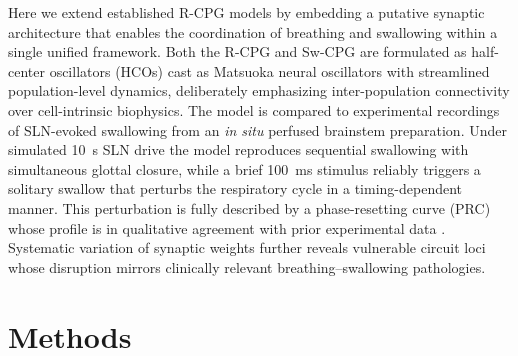 \documentclass[pdflatex,sn-mathphys-ay]{sn-jnl}%
\theoremstyle{thmstyleone}%
\theoremstyle{thmstyletwo}%
\theoremstyle{thmstylethree}%
\begin{document}
Here we extend established R-CPG models \citep{smith1991pre, rybak2004modeling, rubin2009multiple} by embedding a putative synaptic architecture that enables the coordination of breathing and swallowing within a single unified framework. Both the R-CPG and Sw-CPG are formulated as half-center oscillators (HCOs) cast as Matsuoka neural oscillators \citep{matsuoka2011analysis} with streamlined population-level dynamics, deliberately emphasizing inter-population connectivity over cell-intrinsic biophysics. The model is compared to experimental recordings of SLN-evoked swallowing from an \textit{in situ} perfused brainstem preparation. Under simulated 10~s SLN drive the model reproduces sequential swallowing with simultaneous glottal closure, while a brief 100~ms stimulus reliably triggers a solitary swallow that perturbs the respiratory cycle in a timing-dependent manner. This perturbation is fully described by a phase-resetting curve (PRC) whose profile is in qualitative agreement with prior experimental data \citep{oku1992phase}. Systematic variation of synaptic weights further reveals vulnerable circuit loci whose disruption mirrors clinically relevant breathing--swallowing pathologies.

\section{Methods}\label{Methods}
\end{document}
